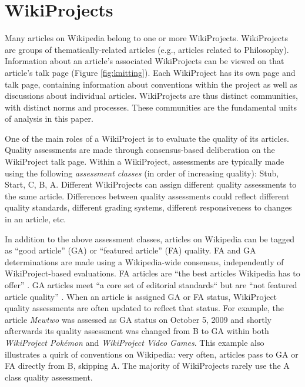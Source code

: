 \documentclass[letterpaper,twocolumn,10pt]{article}
\newcommand{\+}{\phantom{-}}
\begin{document}
\section{WikiProjects}
\label{sec:wp}

Many articles on Wikipedia belong to one or more WikiProjects.
WikiProjects are groups of thematically-related articles
(e.g., articles related to Philosophy).
Information about an article's associated WikiProjects
can be viewed on that
article's talk page (Figure \ref{fig:knitting}).
Each WikiProject has its own page and talk page,
containing information about conventions within the project
as well as discussions about individual articles.
WikiProjects are thus distinct communities, with distinct norms and processes.
These communities are the fundamental units of analysis in this paper.

One of the main roles of a WikiProject is to evaluate the quality of its articles.
Quality assessments are made through consensus-based deliberation on the WikiProject
talk page.
Within a WikiProject,
assessments are typically made using the following {\em assessment classes}
(in order of increasing quality):
Stub, Start, C, B, A.
Different WikiProjects can assign different quality assessments to the same
article.
Differences between quality assessments could reflect different quality standards,
different grading systems, different responsiveness to changes in an article, etc.

In addition to the above assessment classes, articles on Wikipedia can be tagged as
``good article'' (GA) or ``featured article'' (FA) quality.
FA and GA determinations are made using a Wikipedia-wide consensus,
independently of WikiProject-based evaluations.
FA articles are ``the best articles Wikipedia has to offer''
\cite{wikipedia_contributors_wikipedia:featured_2018}.
GA articles meet ``a core set of editorial standards`` but are ``not featured article quality''
\cite{wikipedia_contributors_wikipedia:good_2017}.
When an article is assigned GA or FA status,
WikiProject quality assessments are often updated to reflect that status.
For example, the article {\em Mewtwo} was assessed as GA status on October 5,
2009 and shortly afterwards
its quality assessment was changed from B to GA within both
{\em WikiProject Pok\'emon} and
{\em WikiProject Video Games}.
This example also illustrates a quirk of conventions on Wikipedia:
very often, articles pass to GA or FA directly from B, skipping A.
The majority of WikiProjects rarely use the A class quality assessment.
\end{document}
